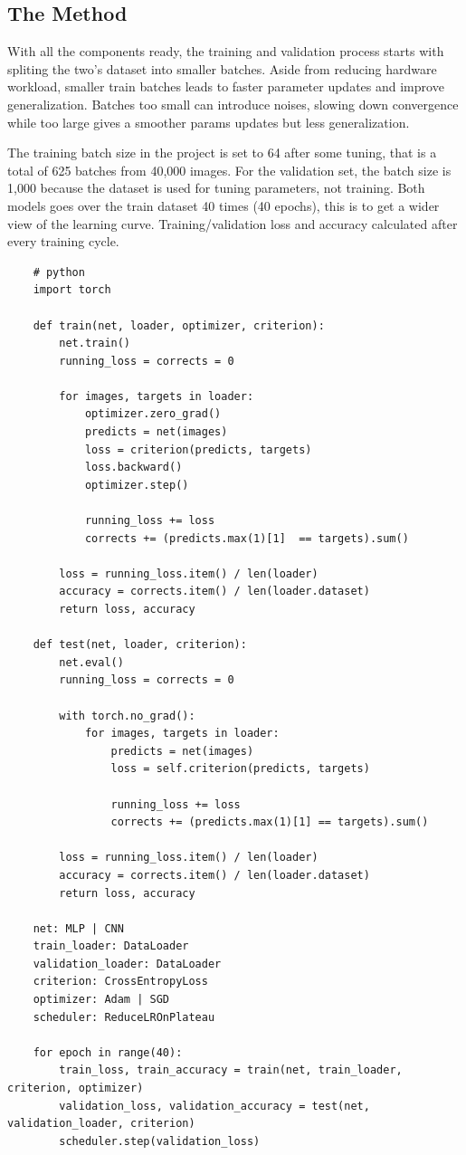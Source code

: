 \documentclass{report}
\begin{document}
\subsection{The Method}
With all the components ready, the training and validation process starts with spliting the two's dataset into 
smaller batches. Aside from reducing hardware workload, smaller train batches leads to faster parameter updates 
and improve generalization. Batches too small can introduce noises, slowing down convergence while too large 
gives a smoother params updates but less generalization. 

The training batch size in the project is set to 64 after some tuning, that is a total of 625 batches from 40,000 
images. For the validation set, the batch size is 1,000 because the dataset is used for tuning parameters, not 
training. Both models goes over the train dataset 40 times (40 epochs), this is to get a wider view of the learning 
curve. Training/validation loss and accuracy calculated after every training cycle.

\begin{verbatim}
    # python
    import torch

    def train(net, loader, optimizer, criterion):
        net.train()
        running_loss = corrects = 0

        for images, targets in loader:
            optimizer.zero_grad()
            predicts = net(images)
            loss = criterion(predicts, targets)
            loss.backward()
            optimizer.step()

            running_loss += loss
            corrects += (predicts.max(1)[1]  == targets).sum()

        loss = running_loss.item() / len(loader)
        accuracy = corrects.item() / len(loader.dataset)
        return loss, accuracy

    def test(net, loader, criterion):
        net.eval()
        running_loss = corrects = 0
        
        with torch.no_grad():
            for images, targets in loader:
                predicts = net(images)
                loss = self.criterion(predicts, targets)

                running_loss += loss
                corrects += (predicts.max(1)[1] == targets).sum()

        loss = running_loss.item() / len(loader)
        accuracy = corrects.item() / len(loader.dataset)
        return loss, accuracy

    net: MLP | CNN
    train_loader: DataLoader
    validation_loader: DataLoader
    criterion: CrossEntropyLoss
    optimizer: Adam | SGD
    scheduler: ReduceLROnPlateau

    for epoch in range(40):
        train_loss, train_accuracy = train(net, train_loader, criterion, optimizer)
        validation_loss, validation_accuracy = test(net, validation_loader, criterion)
        scheduler.step(validation_loss)
\end{verbatim}
\end{document}
